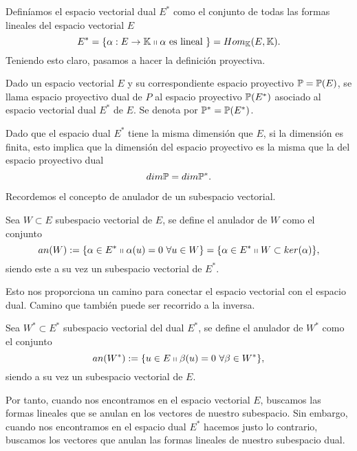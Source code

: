 Definíamos el espacio vectorial dual $E^*$ como el conjunto de todas las formas lineales del espacio vectorial $E$
\begin{equation}
	E^*=\{\alpha:E\rightarrow \mathbb{K}\shortparallel \alpha \text{ es lineal }\}=Hom_{\mathbb{K}}(E,\mathbb{K}).
\end{equation}
Teniendo esto claro, pasamos a hacer la definición proyectiva.
\begin{defi}
	Dado un espacio vectorial $E$ y su correspondiente espacio proyectivo $\mathbb{P}=\mathbb{P}(E)$, se llama espacio proyectivo dual de $P$ al espacio proyectivo $\mathbb{P}(E^*)$ asociado al espacio vectorial dual $E^*$ de $E$. Se denota por $\mathbb{P}^*=\mathbb{P}(E^*)$.
\end{defi}
\begin{obs}
	Dado que el espacio dual $E^*$ tiene la misma dimensión que $E$, si la dimensión es finita, esto implica que la dimensión del espacio proyectivo es la misma que la del espacio proyectivo dual
	\begin{equation*}
		dim \mathbb{P}=dim \mathbb{P}^*.
	\end{equation*}
\end{obs}
Recordemos el concepto de anulador de un subespacio vectorial.
\begin{defi}[Anulador]
	Sea $W\subset E$ subespacio vectorial de $E$, se define el anulador de $W$ como el conjunto
	\begin{equation}
		an(W):=\{\alpha\in E^*\shortparallel \alpha(u)=0 \ \forall u\in W\}=\{\alpha\in E^*\shortparallel W\subset ker(\alpha)\},
	\end{equation}
	siendo este a su vez un subespacio vectorial de $E^*$.
\end{defi}
Esto nos proporciona un camino para conectar el espacio vectorial con el espacio dual. Camino que también puede ser recorrido a la inversa.
\begin{defi}
	Sea $W^*\subset E^*$ subespacio vectorial del dual $E^*$, se define el anulador de $W^*$ como el conjunto
	\begin{equation}
		an(W^*):=\{u\in E\shortparallel \beta(u)=0 \ \forall \beta\in W^*\},
	\end{equation}
	siendo a su vez un subespacio vectorial de $E$.
\end{defi}
Por tanto, cuando nos encontramos en el espacio vectorial $E$, buscamos las formas lineales que se anulan en los vectores de nuestro subespacio. Sin embargo, cuando nos encontramos en el espacio dual $E^*$ hacemos justo lo contrario, buscamos los vectores que anulan las formas lineales de nuestro subespacio dual. 

